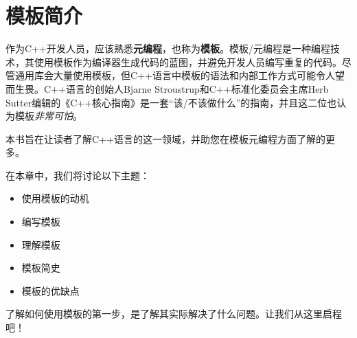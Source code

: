 \chapter{模板简介}
作为C++开发人员，应该熟悉\textbf{元编程}，也称为\textbf{模板}。模板/元编程是一种编程技术，其使用模板作为编译器生成代码的蓝图，并避免开发人员编写重复的代码。尽管通用库会大量使用模板，但C++语言中模板的语法和内部工作方式可能令人望而生畏。C++语言的创始人Bjarne Stroustrup和C++标准化委员会主席Herb Sutter编辑的《C++核心指南》是一套“该/不该做什么”的指南，并且这二位也认为模板\textit{非常可怕}。

本书旨在让读者了解C++语言的这一领域，并助您在模板元编程方面了解的更多。

在本章中，我们将讨论以下主题：

\begin{itemize}
\item 使用模板的动机
\item 编写模板
\item 理解模板
\item 模板简史
\item 模板的优缺点
\end{itemize}

了解如何使用模板的第一步，是了解其实际解决了什么问题。让我们从这里启程吧！








